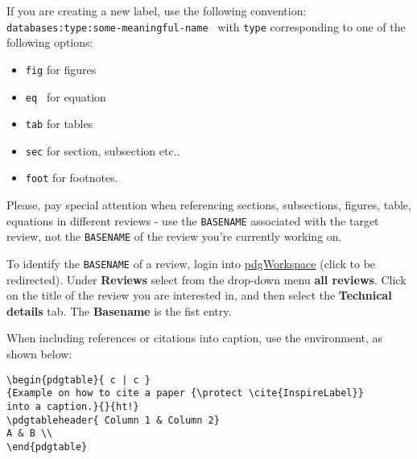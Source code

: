 If you are creating a new label, use the following convention: {\tt databases:type:some-meaningful-name }
with {\tt type} corresponding to one of the following options:
\begin{itemize}
\item {\tt fig} for figures
\item {\tt eq } for equation
\item {\tt tab} for tables
\item {\tt sec} for section, subsection etc..
\item {\tt foot} for footnotes.
\end{itemize}

Please, pay special attention when referencing sections, subsections, figures, table, equations in different reviews - use the {\tt BASENAME} associated
with the target review, not the {\tt BASENAME} of the review you're currently working on. 


To identify the {\tt BASENAME} of a review, login into \href{https://pdgprod.lbl.gov/pdgprod/PdgWorkspace/Reviews.action}{pdgWorkspace} (click to be redirected). Under \textbf{Reviews} select from the drop-down menu \textbf{all reviews}. Click on the title of the review you are interested in, and then select the \textbf{Technical details} tab. The \textbf{Basename} is the fist entry.

When including references or citations into caption, use the {\tt \string\protect} environment, as shown below:
\begin{verbatim}
\begin{pdgtable}{ c | c }
{Example on how to cite a paper {\protect \cite{InspireLabel}}
into a caption.}{}{ht!} 
\pdgtableheader{ Column 1 & Column 2}
A & B \\
\end{pdgtable}
\end{verbatim}



